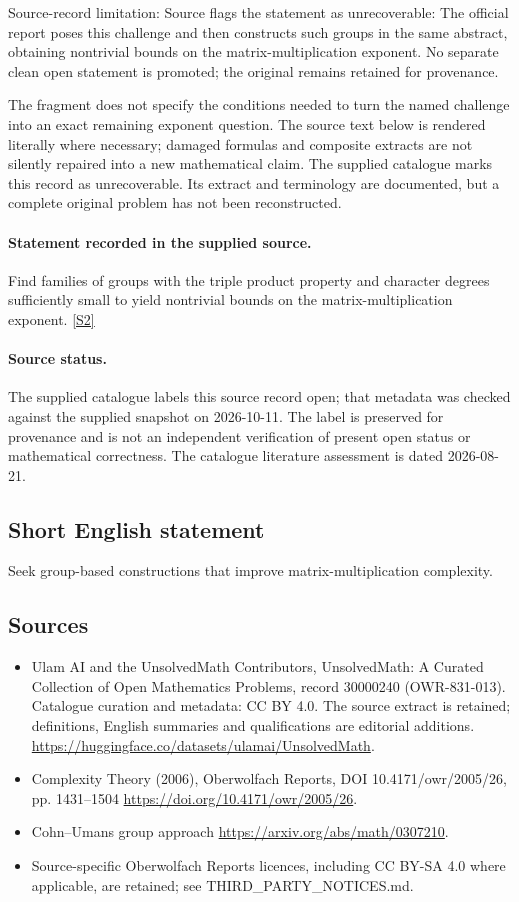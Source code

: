\documentclass[11pt]{article}
\begin{document}
Source-record limitation: Source flags the statement as unrecoverable: The official report poses this challenge and then constructs such groups in the same abstract, obtaining nontrivial bounds on the matrix-multiplication exponent. No separate clean open statement is promoted; the original remains retained for provenance.

The fragment does not specify the conditions needed to turn the named challenge into an exact remaining exponent question.
The source text below is rendered literally where necessary; damaged formulas and composite extracts are not silently repaired into a new mathematical claim.
The supplied catalogue marks this record as unrecoverable. Its extract and terminology are documented, but a complete original problem has not been reconstructed.
\paragraph{Statement recorded in the supplied source.}
Find families of groups with the triple product property and character degrees sufficiently small to yield nontrivial bounds on the matrix-multiplication exponent. \href{https://doi.org/10.4171/owr/2005/26}{[S2]}
\paragraph{Source status.}
The supplied catalogue labels this source record open; that metadata was checked against the supplied snapshot on 2026-10-11. The label is preserved for provenance and is not an independent verification of present open status or mathematical correctness. The catalogue literature assessment is dated 2026-08-21.
\subsection{Short English statement}
Seek group-based constructions that improve matrix-multiplication complexity.
\subsection{Sources}
\begin{itemize}
\item[S1] Ulam AI and the UnsolvedMath Contributors, UnsolvedMath: A Curated Collection of Open Mathematics Problems, record 30000240 (OWR-831-013). Catalogue curation and metadata: CC BY 4.0. The source extract is retained; definitions, English summaries and qualifications are editorial additions.
\url{https://huggingface.co/datasets/ulamai/UnsolvedMath}.
\item[S2] Complexity Theory (2006), Oberwolfach Reports, DOI 10.4171/owr/2005/26, pp. 1431--1504
\url{https://doi.org/10.4171/owr/2005/26}.
\item[S3] Cohn--Umans group approach
\url{https://arxiv.org/abs/math/0307210}.
\item Source-specific Oberwolfach Reports licences, including CC BY-SA 4.0 where applicable, are retained; see THIRD\_PARTY\_NOTICES.md.
\end{itemize}
\end{document}
